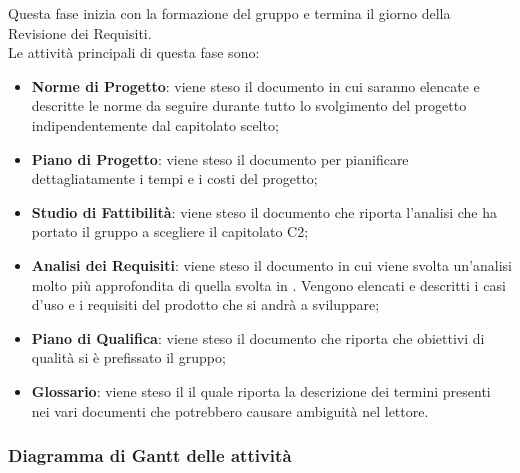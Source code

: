 	Questa fase inizia con la formazione del gruppo e termina il giorno della Revisione dei Requisiti. \\
	Le attività principali di questa fase sono: 
		\begin{itemize}
			\item \textbf{Norme di Progetto}: viene steso il documento \NPdoc in cui saranno elencate e descritte le norme da seguire durante tutto lo svolgimento del progetto indipendentemente dal capitolato scelto;
			\item \textbf{Piano di Progetto}: viene steso il documento \PPdoc per pianificare dettagliatamente i tempi e i costi del progetto;
			\item \textbf{Studio di Fattibilità}: viene steso il documento \SFdoc che riporta l'analisi che ha portato il gruppo a scegliere il capitolato C2;
			\item \textbf{Analisi dei Requisiti}: viene steso il documento \ARdoc in cui viene svolta un'analisi molto più approfondita di quella svolta in \SFdoc. Vengono elencati e descritti i casi d'uso e i requisiti del prodotto che si andrà a sviluppare;
			\item \textbf{Piano di Qualifica}: viene steso il documento \PQdoc che riporta che obiettivi di qualità si è prefissato il gruppo;
			\item \textbf{Glossario}: viene steso il \Gldoc il quale riporta la descrizione dei termini presenti nei vari documenti che potrebbero causare ambiguità nel lettore.
		\end{itemize}
		
		\subsubsection{Diagramma di Gantt delle attività}
		
		\begin{comment}
		\begin{figure}[h]
			\centering
			\texttt{[image: img/A.png]} 
			\caption{Diagramma di Gantt - Fase A}
		\end{figure}
		\end{comment}
		
		
